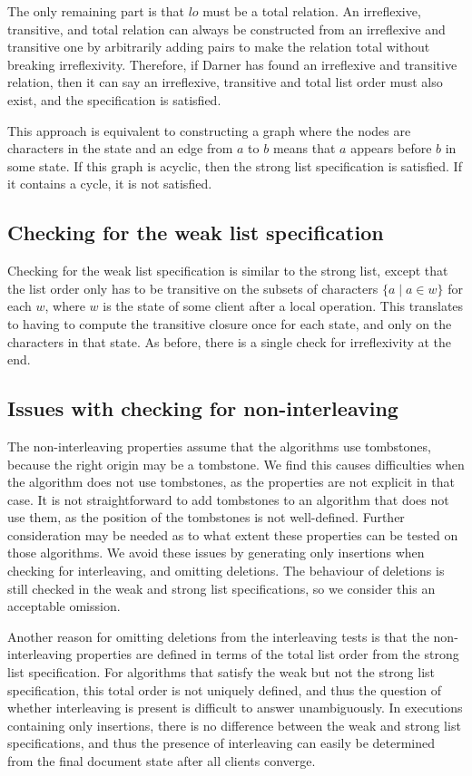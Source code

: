 \documentclass[sigplan,10pt,review,anonymous]{acmart}
\begin{document}
The only remaining part is that $\mathit{lo}$ must be a total relation. An irreflexive, transitive, and total relation can always be constructed from an irreflexive and transitive one by arbitrarily adding pairs to make the relation total without breaking irreflexivity. Therefore, if Darner has found an irreflexive and transitive relation, then it can say an irreflexive, transitive and total list order must also exist, and the specification is satisfied.

This approach is equivalent to constructing a graph where the nodes are characters in the state and an edge from $a$ to $b$ means that $a$ appears before $b$ in some state. If this graph is acyclic, then the strong list specification is satisfied. If it contains a cycle, it is not satisfied.

\subsection{Checking for the weak list specification}

Checking for the weak list specification is similar to the strong list, except that the list order only has to be transitive on the subsets of characters
$\{a \mid a \in w \}$ for each $w$, where $w$ is the state of some client after a local operation. This translates to having to compute the transitive closure once for each
state, and only on the characters in that state. As before, there is a single check for irreflexivity at the end.

\subsection{Issues with checking for non-interleaving}

The non-interleaving properties assume that the algorithms use tombstones, because the right origin may be a tombstone. We find this causes difficulties when the algorithm does not use tombstones, as the properties are not explicit in that case. It is not straightforward to add tombstones to an algorithm that does not use them, as the position of the tombstones is not well-defined. Further consideration may be needed as to what extent these properties can be tested
on those algorithms. We avoid these issues by generating only insertions when checking for interleaving, and omitting deletions. The behaviour of deletions is still checked in the weak and strong list specifications, so we consider this an acceptable omission.

Another reason for omitting deletions from the interleaving tests is that the non-interleaving properties are defined in terms of the total list order from the strong list specification.
For algorithms that satisfy the weak but not the strong list specification, this total order is not uniquely defined, and thus the question of whether interleaving is present is difficult to answer unambiguously.
In executions containing only insertions, there is no difference between the weak and strong list specifications, and thus the presence of interleaving can easily be determined from the final document state after all clients converge.
\end{document}
